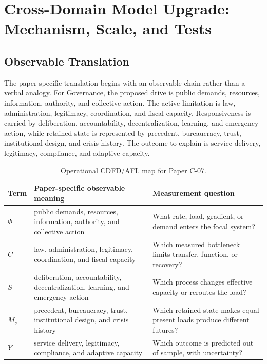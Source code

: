 \documentclass[11pt,a4paper]{article}
\begin{document}
\section{Cross-Domain Model Upgrade: Mechanism, Scale, and Tests}

\subsection{Observable Translation}

The paper-specific translation begins with an observable chain rather than a
verbal analogy. For Governance, the proposed drive is public demands, resources, information, authority, and collective action.
The active limitation is law, administration, legitimacy, coordination, and fiscal capacity. Responsiveness is carried by
deliberation, accountability, decentralization, learning, and emergency action, while retained state is represented by
precedent, bureaucracy, trust, institutional design, and crisis history. The outcome to explain is service delivery, legitimacy, compliance, and adaptive capacity.

\begin{table}[htbp]
\centering
\small
\caption{Operational CDFD/AFL map for Paper C-07.}
\begin{tabularx}{\textwidth}{|l|X|X|}
\hline
\textbf{Term} & \textbf{Paper-specific observable meaning} & \textbf{Measurement question} \\
\hline
$\Phi$ & public demands, resources, information, authority, and collective action & What rate, load, gradient, or demand enters the focal system? \\
\hline
$C$ & law, administration, legitimacy, coordination, and fiscal capacity & Which measured bottleneck limits transfer, function, or recovery? \\
\hline
$S$ & deliberation, accountability, decentralization, learning, and emergency action & Which process changes effective capacity or reroutes the load? \\
\hline
$M_s$ & precedent, bureaucracy, trust, institutional design, and crisis history & Which retained state makes equal present loads produce different futures? \\
\hline
$Y$ & service delivery, legitimacy, compliance, and adaptive capacity & Which outcome is predicted out of sample, with uncertainty? \\
\hline
\end{tabularx}
\end{table}
\end{document}

